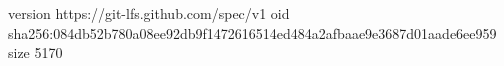 version https://git-lfs.github.com/spec/v1
oid sha256:084db52b780a08ee92db9f1472616514ed484a2afbaae9e3687d01aade6ee959
size 5170
